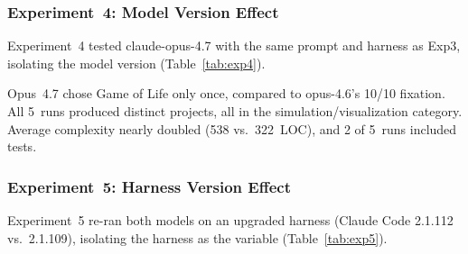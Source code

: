\documentclass{article}
\begin{document}
\subsubsection{Experiment~4: Model Version Effect}

Experiment~4 tested claude-opus-4.7 with the same prompt and
harness as Exp3, isolating the model version
(Table~\ref{tab:exp4}).

\begin{table}[t]
\caption{Experiment~4: opus-4.7 (harness 2.1.109).}
\label{tab:exp4}
\small{}
\end{table}

Opus~4.7 chose Game of Life only once, compared to opus-4.6's
10/10 fixation. All 5~runs produced distinct projects, all in the
simulation/visualization category. Average complexity nearly
doubled (538 vs.\ 322~LOC), and 2 of 5~runs included tests.

\subsubsection{Experiment~5: Harness Version Effect}

Experiment~5 re-ran both models on an upgraded harness (Claude
Code 2.1.112 vs.\ 2.1.109), isolating the harness as the
variable (Table~\ref{tab:exp5}).
\end{document}
